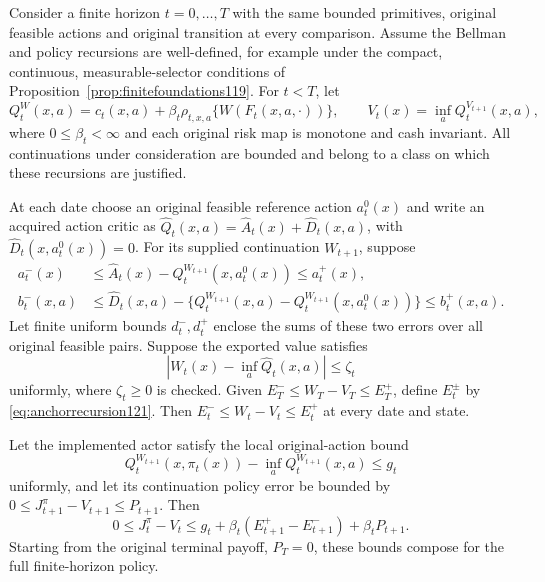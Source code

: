 \begin{theorem}
\label{thm:recursiveanchor121}
Consider a finite horizon \(t=0,\ldots,T\) with
the same bounded primitives, original feasible
actions and original transition at every comparison.
Assume the Bellman and policy recursions are
well-defined, for example under the compact,
continuous, measurable-selector conditions of
Proposition~\ref{prop:finitefoundations119}.
For \(t<T\), let
\[
 Q_t^W(x,a)=c_t(x,a)+
       \beta_t\rho_{t,x,a}\{W(F_t(x,a,\cdot))\},
 \qquad V_t(x)=\inf_a Q_t^{V_{t+1}}(x,a),
\]
where \(0\leq\beta_t<\infty\) and each original
risk map is monotone and cash invariant.
All continuations under consideration are bounded
and belong to a class on which these recursions
are justified.

At each date choose an original feasible reference
action \(a_t^0(x)\) and write an acquired action
critic as
\(\widehat Q_t(x,a)=\widehat A_t(x)+\widehat D_t(x,a)\),
with \(\widehat D_t(x,a_t^0(x))=0\).
For its supplied continuation \(W_{t+1}\), suppose
\begin{align*}
 a_t^-(x)&\leq
   \widehat A_t(x)-Q_t^{W_{t+1}}(x,a_t^0(x))
                                          \leq a_t^+(x),\\
 b_t^-(x,a)&\leq
   \widehat D_t(x,a)
    -\{Q_t^{W_{t+1}}(x,a)-Q_t^{W_{t+1}}(x,a_t^0(x))\}
                                          \leq b_t^+(x,a).
\end{align*}
Let finite uniform bounds \(d_t^-,d_t^+\)
enclose the sums of these two errors over all
original feasible pairs.
Suppose the exported value satisfies
\[
 |W_t(x)-\inf_a\widehat Q_t(x,a)|\leq\zeta_t
\]
uniformly, where \(\zeta_t\geq0\) is checked.
Given \(E_T^-\leq W_T-V_T\leq E_T^+\),
define \(E_t^\pm\) by \eqref{eq:anchorrecursion121}.
Then \(E_t^-\leq W_t-V_t\leq E_t^+\) at every
date and state.

Let the implemented actor satisfy the local
original-action bound
\[
 Q_t^{W_{t+1}}(x,\pi_t(x))
       -\inf_aQ_t^{W_{t+1}}(x,a)\leq g_t
\]
uniformly, and let its continuation policy error
be bounded by \(0\leq J_{t+1}^\pi-V_{t+1}\leq P_{t+1}\).
Then
\begin{equation}\label{eq:recursivepolicy121}
 0\leq J_t^\pi-V_t
 \leq g_t+\beta_t(E_{t+1}^+-E_{t+1}^-)
                         +\beta_tP_{t+1}.
\end{equation}
Starting from the original terminal payoff,
\(P_T=0\), these bounds compose for the full
finite-horizon policy.
\end{theorem}

